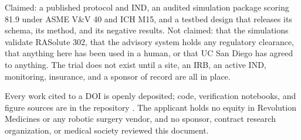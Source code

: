 \vspace{-0.2em}

Claimed: a published protocol and IND, an audited simulation package scoring
81.9 under ASME V\&V 40 and ICH M15, and a testbed design that releases its
schema, its method, and its negative results. Not claimed: that the simulations validate
RASolute 302, that the advisory system holds any regulatory clearance, that
anything here has been used in a human, or that UC San Diego has agreed to
anything. The trial does not exist until a site, an IRB, an active IND,
monitoring, insurance, and a sponsor of record are all in place.

\vspace{-0.2em}

Every work cited to a DOI is openly deposited; code, verification notebooks, and
figure sources are in the repository \cite{repo2026}. The applicant holds no
equity in Revolution Medicines or any robotic surgery vendor, and no sponsor,
contract research organization, or medical society reviewed this document.

\vspace{0.1em}
\apprule{0.4pt}
\vspace{-0.1em}

\vspace{-0.35em}
\begin{apprefs}


\end{apprefs}
